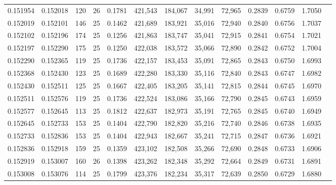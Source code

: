 \begin{tabular}{rrrrrrrrrrrrr}
0.151954 & 0.152018 &   120 &  26 &                                     0.1781 & 421,543 & 184,067 &  34,991 &  72,965 & 0.2839 & 0.6759 & 1.7050 \\
0.152019 & 0.152101 &   146 &  25 &                                     0.1462 & 421,689 & 183,921 &  35,016 &  72,940 & 0.2840 & 0.6756 & 1.7037 \\
0.152102 & 0.152196 &   174 &  25 &                                     0.1256 & 421,863 & 183,747 &  35,041 &  72,915 & 0.2841 & 0.6754 & 1.7021 \\
0.152197 & 0.152290 &   175 &  25 &                                     0.1250 & 422,038 & 183,572 &  35,066 &  72,890 & 0.2842 & 0.6752 & 1.7004 \\
0.152290 & 0.152365 &   119 &  25 &                                     0.1736 & 422,157 & 183,453 &  35,091 &  72,865 & 0.2843 & 0.6750 & 1.6993 \\
0.152368 & 0.152430 &   123 &  25 &                                     0.1689 & 422,280 & 183,330 &  35,116 &  72,840 & 0.2843 & 0.6747 & 1.6982 \\
0.152430 & 0.152511 &   125 &  25 &                                     0.1667 & 422,405 & 183,205 &  35,141 &  72,815 & 0.2844 & 0.6745 & 1.6970 \\
0.152511 & 0.152576 &   119 &  25 &                                     0.1736 & 422,524 & 183,086 &  35,166 &  72,790 & 0.2845 & 0.6743 & 1.6959 \\
0.152577 & 0.152645 &   113 &  25 &                                     0.1812 & 422,637 & 182,973 &  35,191 &  72,765 & 0.2845 & 0.6740 & 1.6949 \\
0.152645 & 0.152733 &   153 &  25 &                                     0.1404 & 422,790 & 182,820 &  35,216 &  72,740 & 0.2846 & 0.6738 & 1.6935 \\
0.152733 & 0.152836 &   153 &  25 &                                     0.1404 & 422,943 & 182,667 &  35,241 &  72,715 & 0.2847 & 0.6736 & 1.6921 \\
0.152836 & 0.152918 &   159 &  25 &                                     0.1359 & 423,102 & 182,508 &  35,266 &  72,690 & 0.2848 & 0.6733 & 1.6906 \\
0.152919 & 0.153007 &   160 &  26 &                                     0.1398 & 423,262 & 182,348 &  35,292 &  72,664 & 0.2849 & 0.6731 & 1.6891 \\
0.153008 & 0.153076 &   114 &  25 &                                     0.1799 & 423,376 & 182,234 &  35,317 &  72,639 & 0.2850 & 0.6729 & 1.6880 \\

\end{tabular}
